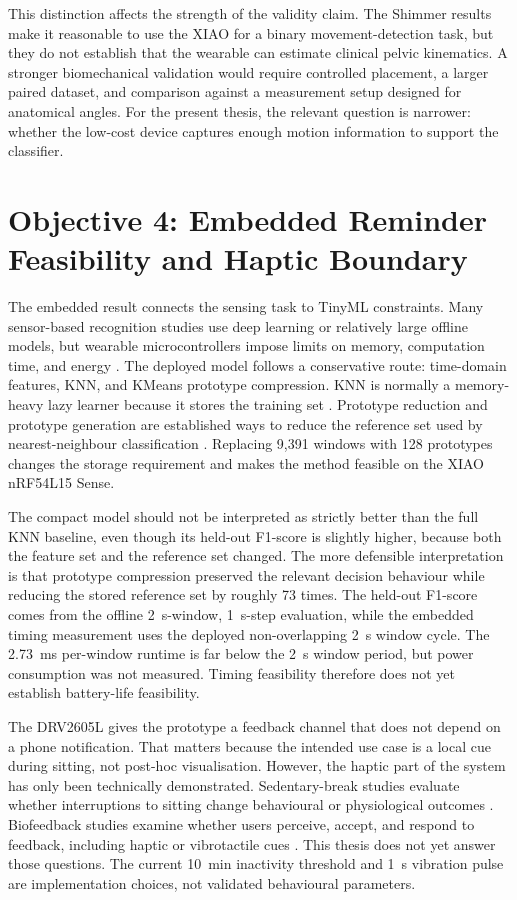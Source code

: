 This distinction affects the strength of the validity claim. The Shimmer results make it reasonable to use the XIAO for a binary movement-detection task, but they do not establish that the wearable can estimate clinical pelvic kinematics. A stronger biomechanical validation would require controlled placement, a larger paired dataset, and comparison against a measurement setup designed for anatomical angles. For the present thesis, the relevant question is narrower: whether the low-cost device captures enough motion information to support the classifier.

\section{Objective 4: Embedded Reminder Feasibility and Haptic Boundary}

The embedded result connects the sensing task to TinyML constraints. Many sensor-based recognition studies use deep learning or relatively large offline models, but wearable microcontrollers impose limits on memory, computation time, and energy \cite{diab2022embedded,abadade2023tinyml}. The deployed model follows a conservative route: time-domain features, KNN, and KMeans prototype compression. KNN is normally a memory-heavy lazy learner because it stores the training set \cite{bonaccorso2017machine}. Prototype reduction and prototype generation are established ways to reduce the reference set used by nearest-neighbour classification \cite{hart1968condensed,triguero2012prototype_generation}. Replacing 9{,}391 windows with 128 prototypes changes the storage requirement and makes the method feasible on the XIAO nRF54L15 Sense.

The compact model should not be interpreted as strictly better than the full KNN baseline, even though its held-out F1-score is slightly higher, because both the feature set and the reference set changed. The more defensible interpretation is that prototype compression preserved the relevant decision behaviour while reducing the stored reference set by roughly 73 times. The held-out F1-score comes from the offline 2~s-window, 1~s-step evaluation, while the embedded timing measurement uses the deployed non-overlapping 2~s window cycle. The 2.73~ms per-window runtime is far below the 2~s window period, but power consumption was not measured. Timing feasibility therefore does not yet establish battery-life feasibility.

The DRV2605L gives the prototype a feedback channel that does not depend on a phone notification. That matters because the intended use case is a local cue during sitting, not post-hoc visualisation. However, the haptic part of the system has only been technically demonstrated. Sedentary-break studies evaluate whether interruptions to sitting change behavioural or physiological outcomes \cite{buffey2022_interrupting_sitting_meta}. Biofeedback studies examine whether users perceive, accept, and respond to feedback, including haptic or vibrotactile cues \cite{battis2024wearable}. This thesis does not yet answer those questions. The current 10~min inactivity threshold and 1~s vibration pulse are implementation choices, not validated behavioural parameters.

